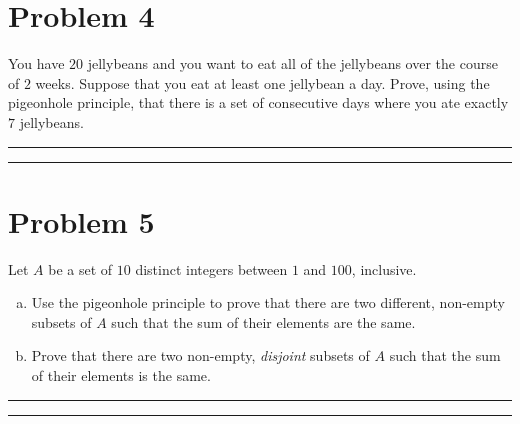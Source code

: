 \documentclass{article}
\theoremstyle{definition}
\newenvironment{solution}{\bigskip\hrule{\hfill}}{\bigskip\hrule{\hfill}} %
\begin{document}

\newpage


\section*{Problem 4}
You have $20$ jellybeans and you want to eat all of the jellybeans over the course of $2$ weeks. Suppose that you eat at least one jellybean a day. Prove, using the pigeonhole principle, that there is a set of consecutive days where you ate exactly $7$ jellybeans.

\begin{solution}


\end{solution}


\newpage


\section*{Problem 5}
Let $A$ be a set of $10$ distinct integers between $1$ and $100$, inclusive.
\begin{enumerate}[a)] %
    \item Use the pigeonhole principle to prove that there are two different, non-empty subsets of $A$ such that the sum of their elements are the same.
    \item Prove that there are two non-empty, \emph{disjoint} subsets of $A$ such that the sum of their elements is the same.
\end{enumerate}
\begin{solution}


\end{solution}
\end{document}
